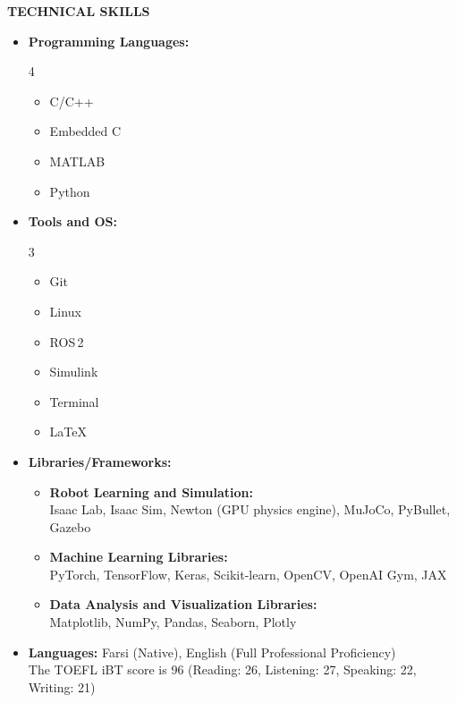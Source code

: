 \documentclass[12pt]{article}
\begin{document}
\begin{center}
	{\noindent \bfseries TECHNICAL SKILLS}
\end{center}
\vspace{-8pt}
\vspace{-8pt}
\begin{itemize} \itemsep -12pt
	\item \textbf{Programming Languages:}
	\vspace{-8pt}
	\begin{multicols}{4}
		\begin{itemize}
			\item C/C++
			\item Embedded C
			\item MATLAB
			\item Python
		\end{itemize}
	\end{multicols}
	\item \textbf{Tools and OS:}
	\vspace{-8pt}
	\begin{multicols}{3}
		\begin{itemize}
			\item Git \faGit*
			\item Linux \faLinux
			\item ROS\,2
			\item Simulink
			\item Terminal \faTerminal
			\item \LaTeX
		\end{itemize}
	\end{multicols}
	\item \textbf{Libraries/Frameworks:}
	\vspace{-8pt}
	\begin{itemize}
		\item \textbf{Robot Learning and Simulation:}\\
		Isaac Lab, Isaac Sim, Newton (GPU physics engine), MuJoCo, PyBullet, Gazebo

		\item \textbf{Machine Learning Libraries:}\\
		PyTorch, TensorFlow, Keras, Scikit-learn, OpenCV, OpenAI Gym, JAX

		\item \textbf{Data Analysis and Visualization Libraries:}\\
		Matplotlib, NumPy, Pandas, Seaborn, Plotly
	\end{itemize}
	\vspace{4pt}
	\item \textbf{Languages:} Farsi (Native), English (Full Professional Proficiency)
	\vspace{1pt} \\
	The TOEFL iBT score is 96 (Reading: 26, Listening: 27, Speaking: 22, Writing: 21)
\end{itemize}
\end{document}
